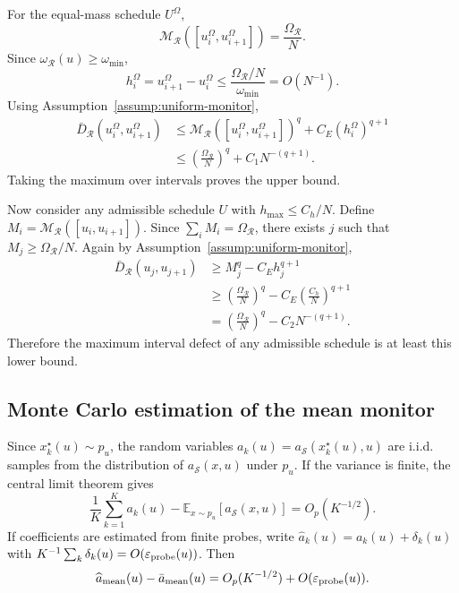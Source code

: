 For the equal-mass schedule $U^\Omega$,
\begin{equation}
  \mathcal M_{\mathcal R}([u_i^\Omega,u_{i+1}^\Omega])
  =
  \frac{\Omega_{\mathcal R}}{N}.
\end{equation}
Since $\omega_{\mathcal R}(u)\ge\omega_{\min}$,
\begin{equation}
  h_i^\Omega
  =
  u_{i+1}^\Omega-u_i^\Omega
  \le
  \frac{\Omega_{\mathcal R}/N}{\omega_{\min}}
  =
  O(N^{-1}).
\end{equation}
Using Assumption~\ref{assump:uniform-monitor},
\begin{align}
  \bar D_{\mathcal R}(u_i^\Omega,u_{i+1}^\Omega)
  &\le
  \mathcal M_{\mathcal R}([u_i^\Omega,u_{i+1}^\Omega])^q
  +C_E(h_i^\Omega)^{q+1}\\
  &\le
  \left(\frac{\Omega_{\mathcal R}}{N}\right)^q
  +C_1N^{-(q+1)}.
\end{align}
Taking the maximum over intervals proves the upper bound.

Now consider any admissible schedule $U$ with $h_{\max}\le C_h/N$. Define
$M_i=\mathcal M_{\mathcal R}([u_i,u_{i+1}])$. Since
$\sum_iM_i=\Omega_{\mathcal R}$, there exists $j$ such that
$M_j\ge\Omega_{\mathcal R}/N$. Again by
Assumption~\ref{assump:uniform-monitor},
\begin{align}
  \bar D_{\mathcal R}(u_j,u_{j+1})
  &\ge
  M_j^q-C_Eh_j^{q+1}\\
  &\ge
  \left(\frac{\Omega_{\mathcal R}}{N}\right)^q
  -C_E\left(\frac{C_h}{N}\right)^{q+1}\\
  &=
  \left(\frac{\Omega_{\mathcal R}}{N}\right)^q
  -C_2N^{-(q+1)}.
\end{align}
Therefore the maximum interval defect of any admissible schedule is at least
this lower bound.

\subsection{Monte Carlo estimation of the mean monitor}
\label{app:mc-proof}

Since $x_k^\star(u)\sim p_u$, the random variables
$a_k(u)=a_{\mathcal S}(x_k^\star(u),u)$ are i.i.d. samples from the
distribution of $a_{\mathcal S}(x,u)$ under $p_u$. If the variance is finite,
the central limit theorem gives
\begin{equation}
  \frac{1}{K}\sum_{k=1}^K a_k(u)
  -
  \mathbb E_{x\sim p_u}[a_{\mathcal S}(x,u)]
  =
  O_p(K^{-1/2}).
\end{equation}
If coefficients are estimated from finite probes, write
$\widehat a_k(u)=a_k(u)+\delta_k(u)$ with
$K^{-1}\sum_k\delta_k(u)=O(\varepsilon_{\rm probe}(u))$. Then
\begin{equation}
  \widehat a_{\rm mean}(u)-\bar a_{\rm mean}(u)
  =
  O_p(K^{-1/2})+O(\varepsilon_{\rm probe}(u)).
\end{equation}

